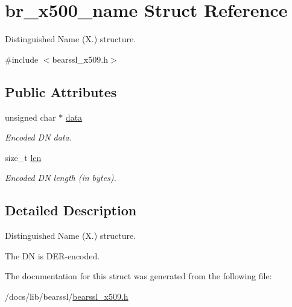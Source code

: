 \hypertarget{structbr__x500__name}{}\section{br\+\_\+x500\+\_\+name Struct Reference}
\label{structbr__x500__name}


Distinguished Name (X.) structure.  




{\ttfamily \#include $<$bearssl\+\_\+x509.\+h$>$}

\subsection*{Public Attributes}
\begin{DoxyCompactItemize}
\item 
\mbox{\label{structbr__x500__name_aa0be18c6acf0e6585f5abde290c873dc}} 
unsigned char $\ast$ \hyperlink{structbr__x500__name_aa0be18c6acf0e6585f5abde290c873dc}{data}
\begin{DoxyCompactList}\small\item\em Encoded DN data. \end{DoxyCompactList}\item 
\mbox{\label{structbr__x500__name_af204bdadd183aee37e421bd2bd516c13}} 
size\+\_\+t \hyperlink{structbr__x500__name_af204bdadd183aee37e421bd2bd516c13}{len}
\begin{DoxyCompactList}\small\item\em Encoded DN length (in bytes). \end{DoxyCompactList}\end{DoxyCompactItemize}


\subsection{Detailed Description}
Distinguished Name (X.) structure. 

The DN is D\+E\+R-\/encoded. 

The documentation for this struct was generated from the following file\+:\begin{DoxyCompactItemize}
\item 
/docs/lib/bearssl/\hyperlink{bearssl__x509_8h}{bearssl\+\_\+x509.\+h}\end{DoxyCompactItemize}
